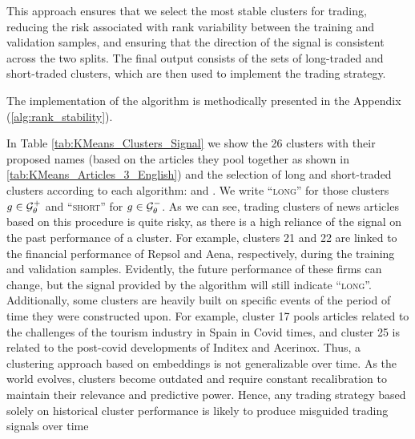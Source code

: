 This approach ensures that we select the most stable clusters for trading, reducing the risk associated with rank variability between the training and validation samples, and ensuring that the direction of the signal is consistent across the two splits. The final output consists of the sets of long-traded and short-traded clusters, which are then used to implement the trading strategy.


The implementation of the algorithm is methodically presented in the Appendix (\cref{alg:rank_stability}).





In Table \ref{tab:KMeans_Clusters_Signal} we show the 26 clusters with their proposed names (based on the articles they pool together as shown in \cref{tab:KMeans_Articles_3_English}) and the selection of long and short-traded clusters according to each algorithm:  and . We write ``\textsc{long}'' for those clusters $g\in\mathcal{G}_\theta^+$ and ``\textsc{short}'' for $g\in\mathcal{G}_\theta^-$. 
%
As we can see, trading clusters of news articles based on this procedure is quite risky, as there is a high reliance of the signal on the past performance of a cluster. For example, clusters 21 and 22 are linked to the financial performance of Repsol and Aena, respectively, during the training and validation samples. Evidently, the future performance of these firms can change, but the signal provided by the algorithm will still indicate ``\textsc{long}''. 
%
Additionally, some clusters are heavily built on specific events of the period of time they were constructed upon. For example, cluster 17 pools articles related to the challenges of the tourism industry in Spain in Covid times, and cluster 25 is related to the post-covid developments of Inditex and Acerinox. Thus, a clustering approach based on embeddings is not generalizable over time. As the world evolves, clusters become outdated and require constant recalibration to maintain their relevance and predictive power. Hence, any trading strategy based solely on historical cluster performance is likely to produce misguided trading signals over time 

